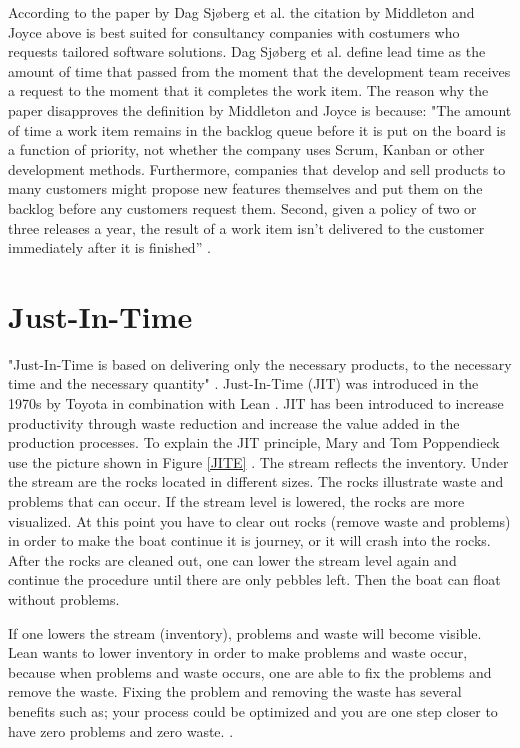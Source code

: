 \documentclass[UKenglish]{ifimaster}  %
\begin{document}
According to the paper by Dag Sj\o berg et al. \parencite{Dag} the citation by Middleton and Joyce above is best suited for consultancy companies with costumers who requests tailored software solutions. Dag Sj\o berg  et al. define lead time as the amount of time that passed from the moment that the development team receives a request to the moment that it completes the work item. The reason why the paper disapproves the definition by Middleton and Joyce is because: "The amount of time a work item remains in the backlog queue before it is put on the board is a function of priority, not whether the company uses Scrum, Kanban or other development methods. Furthermore, companies that develop and sell products to many customers might propose new features themselves and put them on the backlog before any customers request them. Second, given a policy of two or three releases a year, the result of a work item isn't delivered to the customer immediately after it is finished'' \parencite{Dag}.



\section{Just-In-Time}
"Just-In-Time is based on delivering only the necessary products, to the necessary time and the necessary quantity" \parencite{JIT}.
Just-In-Time (JIT) was introduced in the 1970s by Toyota in combination with Lean \parencite{javadian2013just}.  JIT has been introduced to increase productivity through waste reduction and increase the value added in the production processes. To explain the JIT principle, Mary and Tom Poppendieck use the picture shown in Figure \ref{JITE}  \parencite{JIT} \parencite{Lean:2006}. The stream reflects the inventory.  Under the stream are the rocks located in different sizes. The rocks illustrate waste and problems that can occur.  If the stream level is lowered, the rocks are more visualized. At this point you have to clear out rocks (remove waste and problems) in order to make the boat continue it is journey, or it will crash into the rocks. After the rocks are cleaned out, one can lower the stream level again and continue the procedure until there are only pebbles left. Then the boat can float without problems.

If one lowers the stream (inventory), problems and waste will become visible. Lean wants to lower inventory in order to make problems and waste occur, because when problems and waste occurs, one are able to fix the problems and remove the waste. Fixing the problem and removing the waste has several benefits such as; your process could be optimized and you are one step closer to have zero problems and zero waste.  \parencite{JIT} \parencite{Lean:2006}.
\end{document}
